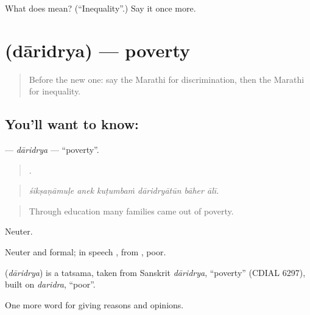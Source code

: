 \begin{tcolorbox}[breakable,colback=teal!4,colframe=teal!35!black,title={Before you move on}]
What does  mean? (\textquotedblleft{}Inequality\textquotedblright{}.) Say it once more.
\end{tcolorbox}
\section[\texorpdfstring{\mr{दारिद्र्य} (dāridrya)}{दारिद्र्य (dāridrya)}]{ (dāridrya) — poverty}

\label{lesson:MR-C360-daridrya}



\begin{quote}
Before the new one: say the Marathi for discrimination, then the Marathi for inequality.
\end{quote}

\subsection*{You'll want to know: }
\textbf{} — \emph{dāridrya} — \textquotedblleft{}poverty\textquotedblright{}.

\begin{quote}
     .
\end{quote}

\begin{quote}
\emph{śikṣaṇāmuḷe anek kuṭumbaṁ dāridryātūn bāher ālī.}
\end{quote}

\begin{quote}
Through education many families came out of poverty.
\end{quote}

Neuter.

Neuter and formal; in speech , from , poor.

\begin{cousinweb}
\textbf{} (\emph{dāridrya}) is a tatsama, taken from Sanskrit \emph{dāridrya}, \textquotedblleft{}poverty\textquotedblright{} (CDIAL 6297), built on \emph{daridra}, \textquotedblleft{}poor\textquotedblright{}.
\end{cousinweb}

\begin{grammarlens}[title={What you've built}]
One more word for giving reasons and opinions.
\end{grammarlens}

